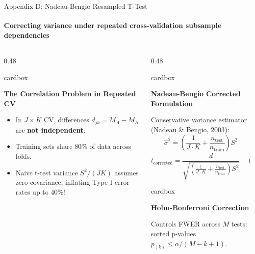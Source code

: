 \documentclass[aspectratio=169, 10pt]{beamer}
\newcommand{\cardbox}[3]{%
  \begin{beamercolorbox}[wd=\linewidth,rounded=true,sep=2.5pt]{cardbox}%
    {\bfseries\scriptsize\color{#1}#2\par}\vspace*{1pt}%
    {\footnotesize #3}%
  \end{beamercolorbox}%
}
\begin{document}
\begin{frame}{Appendix D: Nadeau-Bengio Resampled T-Test}
  \framesubtitle{Correcting variance under repeated cross-validation subsample dependencies}

  \begin{columns}[T]
    \begin{column}{0.48\textwidth}
      \cardbox{DeepPurple}{The Correlation Problem in Repeated CV}{
        \begin{itemize}\setlength\itemsep{1pt}\scriptsize
          \item In $J \times K$ CV, differences $d_{jk} = M_A - M_B$ are \textbf{not independent}.
          \item Training sets share 80\% of data across folds.
          \item Naive t-test variance $S^2 / (JK)$ assumes zero covariance, inflating Type I error rates up to 40\%!
        \end{itemize}
      }
    \end{column}

    \begin{column}{0.48\textwidth}
      \cardbox{TealAccent}{Nadeau-Bengio Corrected Formulation}{
        \scriptsize Conservative variance estimator (Nadeau \& Bengio, 2003):
        \[
          \hat{\sigma}^2 = \left( \frac{1}{J \cdot K} + \frac{n_{\text{test}}}{n_{\text{train}}} \right) S^2
        \]
        \[
          t_{\text{corrected}} = \frac{\bar{d}}{\sqrt{\left( \frac{1}{J \cdot K} + \frac{n_{\text{test}}}{n_{\text{train}}} \right) S^2}} \quad (\text{df} = JK - 1)
        \]
      }
      \vspace*{3pt}
      \cardbox{CardBg}{Holm-Bonferroni Correction}{
        \scriptsize Controls FWER across $M$ tests: sorted p-values $p_{(k)} \le \alpha / (M - k + 1)$.
      }
    \end{column}
  \end{columns}
\end{frame}
\end{document}
